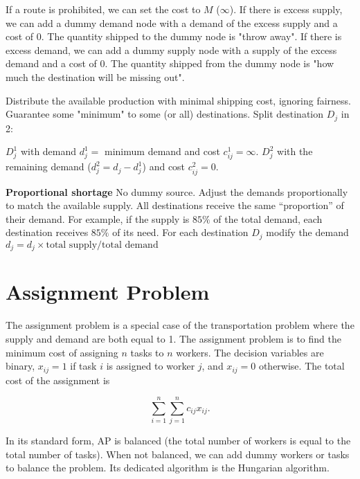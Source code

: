 \documentclass{report}
\begin{document}
\begin{description}
	 If a route is prohibited, we can set the cost to $M$ ($\infty$).
	 If there is excess supply, we can add a dummy demand node with a demand of the excess supply and a cost of 0. The quantity shipped to the dummy node is "throw away".
	 If there is excess demand, we can add a dummy supply node with a supply of the excess demand and a cost of 0. The quantity shipped from the dummy node is "how much the destination will be missing out".
	\begin{itemize}
		\ii Distribute the available production with minimal shipping cost, ignoring fairness.
		\ii Guarantee some "minimum" to some (or all) destinations. Split destination $D_j$ in 2:
		\begin{itemize}
			\ii $D_j^1$ with demand $d_j^1=$ minimum demand and cost $c_{ij}^1=\infty$.
			\ii $D_j^2$ with the remaining demand ($d_j^2=d_j-d_j^1$) and cost $c_{ij}^2=0$.
		\end{itemize}
		\ii \textbf{Proportional shortage} No dummy source. Adjust the demands proportionally to match the available supply. All destinations receive the same “proportion” of their demand. For example, if the supply is $85\%$ of the total demand, each destination receives $85\%$ of its need. For each destination $D_j$ modify the demand $d_j = d_j \times \text{total supply}/\text{total demand}$
	\end{itemize}
\end{description}

\section{Assignment Problem}

The assignment problem is a special case of the transportation problem where the supply and demand are both equal to 1. The assignment problem is to find the minimum cost of assigning $n$ tasks to $n$ workers.
The decision variables are binary, $x_{ij}=1$ if task $i$ is assigned to worker $j$, and $x_{ij}=0$ otherwise. The total cost of the assignment is

\[
	\sum_{i=1}^{n}\sum_{j=1}^{n} c_{ij}x_{ij}
	.\]

In its standard form, AP is balanced (the total number of workers is equal to the total number of tasks). When not balanced, we can add dummy workers or tasks to balance the problem. Its dedicated algorithm is the Hungarian algorithm.
\end{document}
